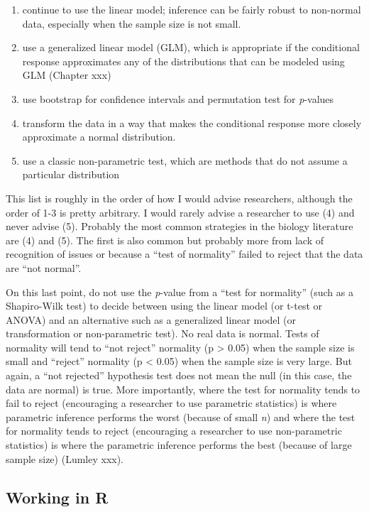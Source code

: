 \documentclass[]{book}
\providecommand{\tightlist}{%
  \setlength{\itemsep}{0pt}\setlength{\parskip}{0pt}}
\begin{document}
\begin{enumerate}
\def\labelenumi{\arabic{enumi}.}
\tightlist
\item
  continue to use the linear model; inference can be fairly robust to non-normal data, especially when the sample size is not small.
\item
  use a generalized linear model (GLM), which is appropriate if the conditional response approximates any of the distributions that can be modeled using GLM (Chapter xxx)
\item
  use bootstrap for confidence intervals and permutation test for \emph{p}-values
\item
  transform the data in a way that makes the conditional response more closely approximate a normal distribution.
\item
  use a classic non-parametric test, which are methods that do not assume a particular distribution
\end{enumerate}

This list is roughly in the order of how I would advise researchers, although the order of 1-3 is pretty arbitrary. I would rarely advise a researcher to use (4) and never advise (5). Probably the most common strategies in the biology literature are (4) and (5). The first is also common but probably more from lack of recognition of issues or because a ``test of normality'' failed to reject that the data are ``not normal''.

On this last point, do not use the \emph{p}-value from a ``test for normality'' (such as a Shapiro-Wilk test) to decide between using the linear model (or t-test or ANOVA) and an alternative such as a generalized linear model (or transformation or non-parametric test). No real data is normal. Tests of normality will tend to ``not reject'' normality (p \textgreater{} 0.05) when the sample size is small and ``reject'' normality (p \textless{} 0.05) when the sample size is very large. But again, a ``not rejected'' hypothesis test does not mean the null (in this case, the data are normal) is true. More importantly, where the test for normality tends to fail to reject (encouraging a researcher to use parametric statistics) is where parametric inference performs the worst (because of small \emph{n}) and where the test for normality tends to reject (encouraging a researcher to use non-parametric statistics) is where the parametric inference performs the best (because of large sample size) (Lumley xxx).

\hypertarget{working-in-r-2}{%
\subsection{Working in R}\label{working-in-r-2}}
\end{document}
